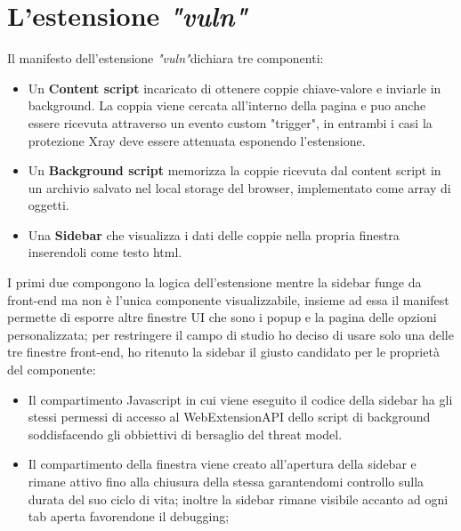 \documentclass[]{./sapthesis/sapthesis}
\newcommand{\vuln}{\textit{"vuln"}}
\begin{document}
    \section{L'estensione \vuln}

        Il manifesto dell'estensione \vuln dichiara tre componenti:
        \begin{itemize}
            \item Un \textbf{Content script} incaricato di ottenere coppie chiave-valore
                e inviarle in background. La coppia viene cercata all'interno della pagina
                e puo anche essere ricevuta attraverso un evento custom "trigger", in
                entrambi i casi la protezione Xray deve essere attenuata esponendo l'estensione.

            \item Un \textbf{Background script} memorizza la coppie ricevuta dal content script 
                in un archivio salvato nel local storage del browser, implementato
                come array di oggetti.

            \item Una \textbf{Sidebar} che visualizza i dati delle coppie nella propria finestra
                inserendoli come testo html.
        \end{itemize}

        I primi due compongono la logica dell'estensione mentre la sidebar funge da front-end ma
        non è l'unica componente visualizzabile, insieme ad essa il manifest permette
        di esporre altre finestre UI che sono i popup e la pagina delle opzioni personalizzata; per
        restringere il campo di studio ho deciso di usare solo una delle tre finestre front-end,
        ho ritenuto la sidebar il giusto candidato per le proprietà del componente:
        \begin{itemize}
            \item Il compartimento Javascript in cui viene eseguito il codice della sidebar
                ha gli stessi permessi di accesso al WebExtensionAPI dello script di background
                soddisfacendo gli obbiettivi di bersaglio del threat model.
            
            \item Il compartimento della finestra viene creato all'apertura della sidebar e rimane
                attivo fino alla chiusura della stessa garantendomi controllo sulla durata
                del suo ciclo di vita; inoltre la sidebar rimane visibile accanto ad ogni tab aperta
                favorendone il debugging;
                
        \end{itemize}
\end{document}
